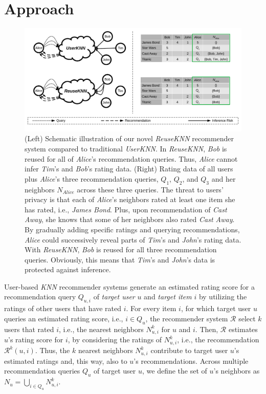 \documentclass[manuscript,review,anonymous]{acmart}
\begin{document}
\section{Approach}
\begin{figure}[!t]
    \centering
    \includegraphics[width=\textwidth]{figures/approach.pdf}
    \caption{
    (Left) Schematic illustration of our novel \emph{ReuseKNN} recommender system compared to traditional \emph{UserKNN}. 
    In \emph{ReuseKNN}, \emph{Bob} is reused for all of \emph{Alice}'s recommendation queries.
    Thus, \emph{Alice} cannot infer \emph{Tim}'s and \emph{Bob}'s rating data.
    (Right) Rating data of all users plus \emph{Alice}'s three recommendation queries, $Q_1$, $Q_2$, and $Q_3$ and her neighbors $N_{Alice}$ across these three queries. 
    The threat to users' privacy is that each of \emph{Alice}'s neighbors rated at least one item she has rated, i.e., \emph{James Bond}. Plus, upon recommendation of \emph{Cast Away}, she knows that some of her neighbors also rated \emph{Cast Away}. By gradually adding specific ratings and querying recommendations, \emph{Alice} could successively reveal parts of \emph{Tim}'s and \emph{John}'s rating data.
    With \emph{ReuseKNN}, \emph{Bob} is reused for all three recommendation queries. Obviously, this means that \emph{Tim}'s and \emph{John}'s data is protected against inference.
    }
    \label{fig:approach}
\end{figure}

User-based \emph{KNN} recommender systems generate an estimated rating score for a recommendation query $Q_{u, i}$ of \emph{target user} $u$ and \emph{target item} $i$ by utilizing the ratings of other users that have rated $i$.
For every item $i$, for which target user $u$ queries an estimated rating score, i.e., $i \in Q_u$, the recommender system $\mathcal{R}$ select $k$ users that rated $i$, i.e., the nearest neighbors $N^k_{u, i}$ for $u$ and $i$.
Then, $\mathcal{R}$ estimates $u$'s rating score for $i$, by considering the ratings of $N^k_{u, i}$, i.e., the recommendation $\mathcal{R}^k(u, i)$.
Thus, the $k$ nearest neighbors $N^k_{u, i}$ contribute to target user $u$'s estimated ratings and, this way, also to $u$'s recommendations.
Across multiple recommendation queries $Q_u$ of target user $u$, we define the set of $u$'s neighbors as $N_u = \bigcup_{i \in Q_u} N^k_{u, i}$.
\end{document}
